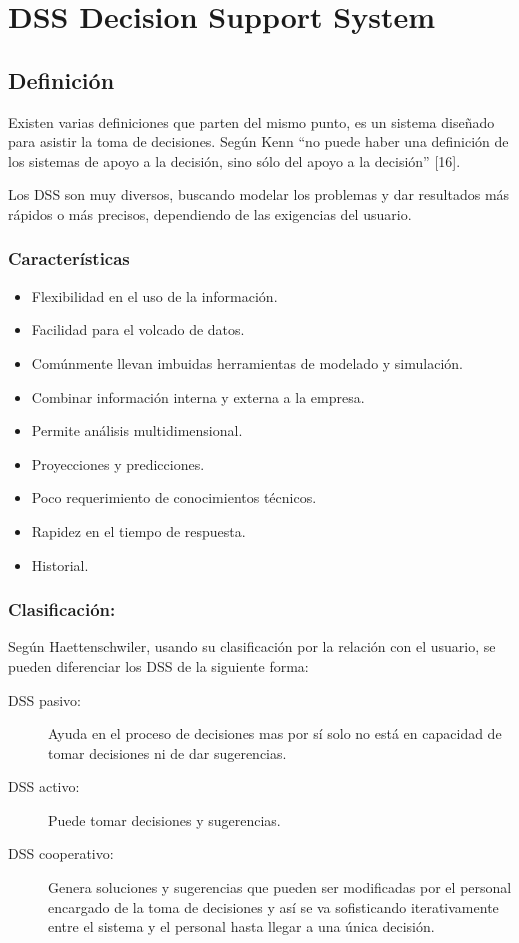 \chapter[DSS]{DSS Decision Support System}
\section {Definición}
Existen varias definiciones que parten del mismo punto, es un sistema diseñado para asistir la toma de decisiones. Según Kenn “no puede haber una definición de los sistemas de apoyo a la decisión, sino sólo del apoyo a la decisión” [16].

Los DSS son muy diversos, buscando modelar los problemas y dar resultados más rápidos o más precisos, dependiendo de las exigencias del usuario.

\subsection{Características}
\begin{itemize}
\item Flexibilidad en el uso de la información.
\item Facilidad para el volcado de datos.
\item Comúnmente llevan imbuidas herramientas de modelado y simulación.
\item Combinar información interna y externa a la empresa.
\item Permite análisis multidimensional.
\item Proyecciones y predicciones.
\item Poco requerimiento de conocimientos técnicos.
\item Rapidez en el tiempo de respuesta.
\item Historial.
\end{itemize}

\subsection {Clasificación:}

Según Haettenschwiler, usando su clasificación por la relación con el usuario, se pueden diferenciar los DSS de la siguiente forma:
\begin{description}
\item [DSS pasivo:] Ayuda en el proceso de decisiones mas por sí solo no está en capacidad de tomar decisiones ni de dar sugerencias.
\item [DSS activo:] Puede tomar decisiones y sugerencias.
\item [DSS cooperativo:] Genera soluciones y sugerencias que pueden ser modificadas por el personal encargado de la toma de decisiones y así se va sofisticando iterativamente entre el sistema y el personal hasta llegar a una única decisión.
\end{description}

